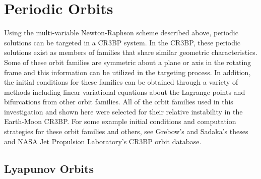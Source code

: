 \section{Periodic Orbits}
Using the multi-variable Newton-Raphson scheme described above, periodic solutions can be targeted
in a CR3BP system. In the CR3BP, these periodic solutions exist as members of families that share
similar geometric characteristics. Some of these orbit families are symmetric about a plane or axis
in the rotating frame and this information can be utilized in the targeting process. In addition,
the initial conditions for these families can be obtained through a variety of methods including
linear variational equations about the Lagrange points and bifurcations from other orbit families.
All of the orbit families used in this investigation and shown here were selected for their
relative instability in the Earth-Moon CR3BP. For some example initial conditions and computation
strategies for these orbit families and others, see Grebow's and Sadaka's theses and NASA Jet
Propulsion Laboratory's CR3BP orbit database\cite{Grebow:2006,Sadaka:2023,Park}.

\subsection{Lyapunov Orbits}
